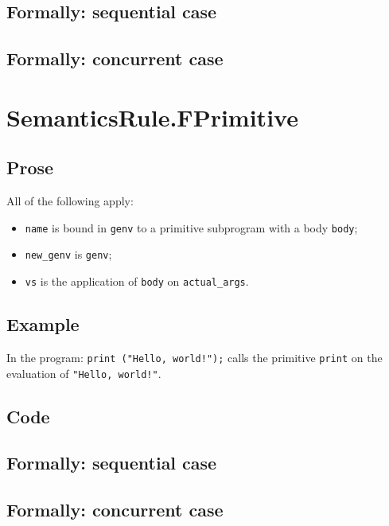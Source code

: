 \documentclass{book}
\begin{document}
\begin{emptyformal}
  \subsection{Formally: sequential case}

  \subsection{Formally: concurrent case}
\end{emptyformal}


\section{SemanticsRule.FPrimitive \label{sec:SemanticsRule.FPrimitive}}

  \subsection{Prose}
  All of the following apply:
  \begin{itemize}
  \item \texttt{name} is bound in \texttt{genv} to a primitive subprogram with a body \texttt{body};
  \item \texttt{new\_genv} is \texttt{genv};
  \item \texttt{vs} is the application of \texttt{body} on \texttt{actual\_args}.
  \end{itemize}

  \subsection{Example}
  In the program:
  \texttt{print ("Hello, world!");} calls the primitive \texttt{print} on the evaluation of \texttt{"Hello, world!"}.

  \subsection{Code}

\begin{emptyformal}
  \subsection{Formally: sequential case}

  \subsection{Formally: concurrent case}
\end{emptyformal}
\end{document}
